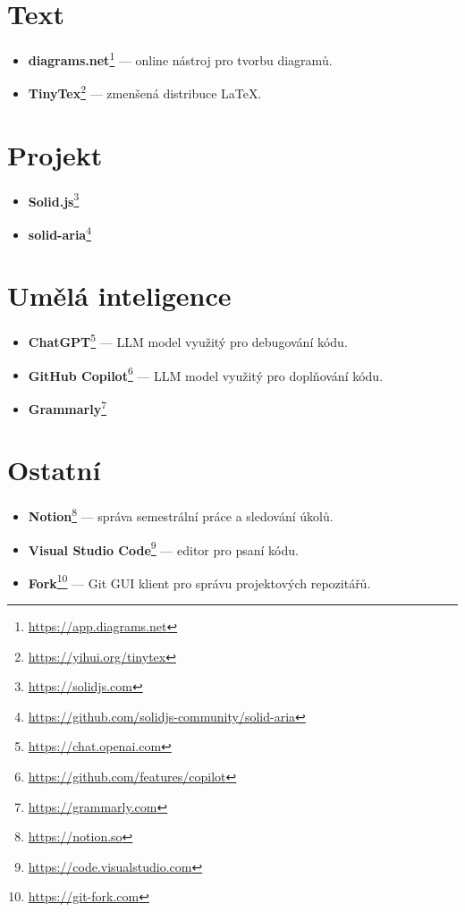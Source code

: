 \clearpage

\section{Text}

\begin{itemize}
    \item \textbf{diagrams.net}\footnote{\url{https://app.diagrams.net}} --- online nástroj pro tvorbu diagramů.
    \item \textbf{TinyTex}\footnote{\url{https://yihui.org/tinytex}} --- zmenšená distribuce \LaTeX.
\end{itemize}

\section{Projekt}

\begin{itemize}
    \item \textbf{Solid.js}\footnote{\url{https://solidjs.com}}
    \item \textbf{solid-aria}\footnote{\url{https://github.com/solidjs-community/solid-aria}}
\end{itemize}

\section{Umělá inteligence}

\begin{itemize}
    \item \textbf{ChatGPT}\footnote{\url{https://chat.openai.com}} --- LLM model využitý pro debugování kódu.
    \item \textbf{GitHub Copilot}\footnote{\url{https://github.com/features/copilot}} --- LLM model využitý pro doplňování kódu.
    \item \textbf{Grammarly}\footnote{\url{https://grammarly.com}}
\end{itemize}

\section{Ostatní}

\begin{itemize}
    \item \textbf{Notion}\footnote{\url{https://notion.so}} --- správa semestrální práce a sledování úkolů.
    \item \textbf{Visual Studio Code}\footnote{\url{https://code.visualstudio.com}} --- editor pro psaní kódu.
    \item \textbf{Fork}\footnote{\url{https://git-fork.com}} --- Git GUI klient pro správu projektových repozitářů.
\end{itemize}
